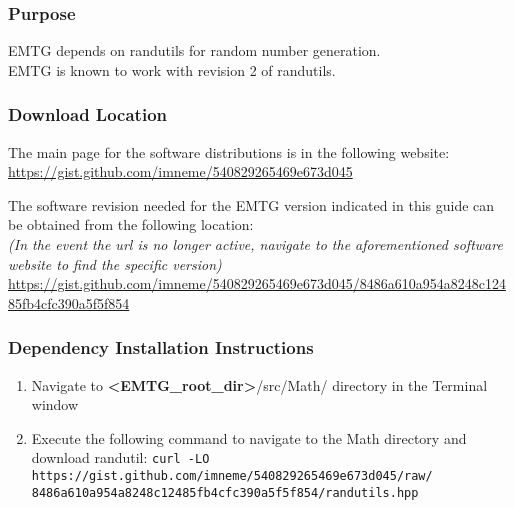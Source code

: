 
\subsubsection{Purpose}
\ac{EMTG} depends on randutils for random number generation. \\ \ac{EMTG} is known to work with revision 2 of randutils.

\subsubsection{Download Location}
\noindent The main page for the software distributions is in the following website: \\
\url{https://gist.github.com/imneme/540829265469e673d045}

\noindent The software revision needed for the EMTG version indicated in this guide can be obtained from the following location: \\
\emph{(In the event the url is no longer active, navigate to the aforementioned software website to find the specific version)} \\
\url{https://gist.github.com/imneme/540829265469e673d045/8486a610a954a8248c12485fb4cfc390a5f5f854}

\subsubsection{Dependency Installation Instructions}
\begin{enumerate}
	\item Navigate to \textbf{\textless EMTG\_root\_dir\textgreater}/src/Math/ directory in the Terminal window
	\item Execute the following command to navigate to the Math directory and download randutil:
		\texttt{curl -LO https://gist.github.com/imneme/540829265469e673d045/raw/} \\
		\texttt{8486a610a954a8248c12485fb4cfc390a5f5f854/randutils.hpp}
\end{enumerate}